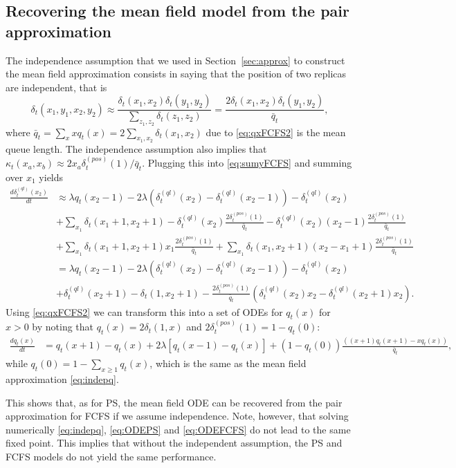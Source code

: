 \documentclass[acmsmall,nonacm]{acmart}
\begin{document}
\subsection{Recovering the mean field model from the pair approximation}
The independence assumption that we used in Section~\ref{sec:approx} to construct the mean field approximation consists in saying that the position of two replicas are independent, that is
\[ \delta_t(x_1,y_1,x_2,y_2)\approx\frac{\delta_t(x_1,x_2)\delta_t(y_1,y_2)}{\sum_{z_1,z_2}\delta_t(z_1,z_2)} = \frac{2\delta_t(x_1,x_2)\delta_t(y_1,y_2)}{\bar q_t}, \]
where $\bar q_t = \sum_{x} x q_t(x) = 2\sum_{x_1,x_2}\delta_t(x_1,x_2)$ due to \eqref{eq:qxFCFS2} is the mean queue length. The independence assumption also implies that
$\kappa_t(x_a,x_b) \approx 2 x_a \delta_t^{(pos)}(1)/\bar q_t$. Plugging this into \eqref{eq:sumyFCFS} and  summing over $x_1$ yields
\begin{align}
    \frac{d \delta_t^{(ql)}(x_2)}{dt}& \approx
    \lambda q_t(x_2-1) -2 \lambda (\delta_t^{(ql)}(x_2)-\delta_t^{(ql)}(x_2-1))
    - \delta_t^{(ql)}(x_2)  \nonumber \\
    &+\sum_{x_1} \delta_t(x_1+1,x_2+1) - \delta_t^{(ql)}(x_2) \frac{2\delta_t^{(pos)}(1)}{\bar q_t}
     - \delta_t^{(ql)}(x_2) (x_2-1) \frac{2\delta_t^{(pos)}(1)}{\bar q_t}
    \nonumber \\
    &+\sum_{x_1} \delta_t(x_1+1,x_2+1)x_1  \frac{2\delta_t^{(pos)}(1)}{\bar q_t}
    +\sum_{x_1} \delta_t(x_1,x_2+1)(x_2-x_1+1)  \frac{2\delta_t^{(pos)}(1)}{\bar q_t} \nonumber \\
    &= \lambda q_t(x_2-1) -2 \lambda (\delta_t^{(ql)}(x_2)-\delta_t^{(ql)}(x_2-1))
    - \delta_t^{(ql)}(x_2)  \nonumber \\
    &+ \delta_t^{(ql)}(x_2+1)-\delta_t(1,x_2+1) -
    \frac{2\delta_t^{(pos)}(1)}{\bar q_t} \left( \delta_t^{(ql)}(x_2) x_2 -
    \delta_t^{(ql)}(x_2+1) x_2 \right).
\end{align}
Using \eqref{eq:qxFCFS2} we can transform this into a set of ODEs for $q_t(x)$ for $x > 0$
by noting that $q_t(x)=2\delta_t(1,x)$ and $2\delta_t^{(pos)}(1)=1-q_t(0)$:
\begin{align}\label{eq:indepqFCFS}
    \frac{d q_t(x)}{dt} &= q_t(x+1) - q_t(x) +2\lambda \left[q_t(x-1)-q_t(x)\right] 
    +  (1-q_t(0)) \frac{((x+1)q_t(x+1)-xq_t(x)) }{\bar q_t},
\end{align}
while $q_t(0)=1-\sum_{x\geq 1} q_t(x)$, which is the same as the mean field approximation \eqref{eq:indepq}.

This shows that, as for PS, the mean field ODE can be recovered from the pair approximation for FCFS if we assume independence. Note, however, that solving numerically \eqref{eq:indepq}, \eqref{eq:ODEPS} and \eqref{eq:ODEFCFS} do not lead to the same fixed point. This implies that without the independent assumption, the PS and FCFS models do not yield the same performance.
\end{document}
